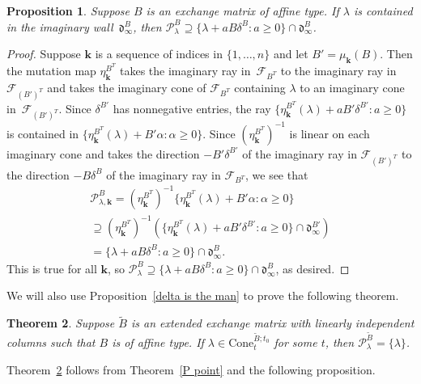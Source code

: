 \documentclass{amsart}
\newtheorem{proposition}{Proposition}[section]
\newtheorem{theorem}[proposition]{Theorem}
\theoremstyle{definition}
\theoremstyle{remark}
\numberwithin{equation}{section}
\newcommand{\set}[1]{{\lbrace #1 \rbrace}}
\newcommand{\F}{{\mathcal F}}
\newcommand{\0}{{\mathbf{0}}}
\newcommand{\Cone}{\mathrm{Cone}}
\newcommand{\kk}{{\boldsymbol{k}}}
\newcommand{\tB}{{\widetilde{B}}}
\renewcommand{\P}{\mathcal{P}}
\renewcommand{\d}{{\mathfrak d}}
\begin{document}
\begin{proposition}\label{affine main partial}
Suppose $B$ is an exchange matrix of affine type.
If $\lambda$ is contained in the imaginary wall~$\d^B_\infty$, then $\P^B_\lambda\supseteq\set{\lambda+aB\delta^B:a\ge0}\cap\d^B_\infty$.  %
\end{proposition}
\begin{proof}
Suppose $\kk$ is a sequence of indices in $\set{1,\ldots,n}$ and let $B'=\mu_\kk(B)$.
Then the mutation map $\eta^{B^T}_\kk$ takes the imaginary ray in~$\F_{B^T}$ to the imaginary ray in~$\F_{(B')^T}$ and takes the imaginary cone of $\F_{B^T}$ containing $\lambda$ to an imaginary cone in~$\F_{(B')^T}$.
Since $\delta^{B'}$ has nonnegative entries, the ray $\set{\eta^{B^T}_\kk(\lambda)+aB'\delta^{B'}:a\ge0}$ is contained in $\set{\eta^{B^T}_\kk(\lambda)+B'\alpha:\alpha\ge0}$.
Since $(\eta_\kk^{B^T})^{-1}$ is linear on each imaginary cone and takes the direction $-B'\delta^{B'}$ of the imaginary ray in $\F_{(B')^T}$ to the direction $-B\delta^B$ of the imaginary ray in $\F_{B^T}$, we see that 
\begin{multline*}
\P^B_{\lambda,\kk}=(\eta_\kk^{B^T})^{-1}\set{\eta^{B^T}_\kk(\lambda)+B'\alpha:\alpha\ge0}\\
\supseteq(\eta_\kk^{B^T})^{-1}\left(\set{\eta^{B^T}_\kk(\lambda)+aB'\delta^{B'}:a\ge0}\cap\d^{B'}_\infty\right)\\
=\set{\lambda+aB\delta^B:a\ge0}\cap\d^B_\infty. 
\end{multline*}
This is true for all $\kk$, so $\P^B_\lambda\supseteq\set{\lambda+aB\delta^B:a\ge0}\cap\d^B_\infty$, as desired.
\end{proof}

We will also use Proposition~\ref{delta is the man} to prove the following theorem.

\begin{theorem}\label{affine P point indep}
Suppose $\tB$ is an extended exchange matrix with linearly independent columns such that $B$ is of affine type.
If $\lambda\in\Cone^{\tB;t_0}_t$ for some $t$, then $\P^\tB_\lambda=\set{\lambda}$.
\end{theorem}

Theorem~\ref{affine P point indep} follows from Theorem~\ref{P point} and the following proposition.
\end{document}
